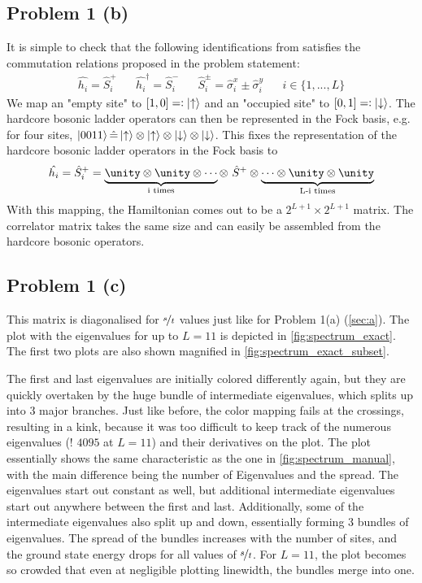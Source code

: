 \subsection{Problem 1 (b)}
    \label{sec:b}
    It is simple to check that the following identifications from  \cite{Streib} satisfies the commutation relations proposed in the problem statement:
    \begin{align}
        \hat{h_i} = \hat{S}^+_i \hspace{20pt} \hat{h_i}^\dagger = \hat{S}^-_i \hspace{20pt} \hat{S}^\pm_i = \hat{\sigma}^x_i\pm\hat{\sigma}^y_i \hspace{20pt} i \in \{1, ..., L\}
    \end{align}
    We map an "empty site" to $[1, 0] =: \ket{\uparrow}$ and an "occupied site" to $[0, 1] =: \ket{\downarrow}$. The hardcore bosonic ladder operators can then be represented in the Fock basis, e.g. for four sites, $\ket{0011} \hat{=} \ket{\uparrow} \otimes \ket{\uparrow} \otimes \ket{\downarrow} \otimes \ket{\downarrow}$. This fixes the representation of the hardcore bosonic ladder operators in the Fock basis to 
    \begin{align}
        \hat{h_i} = \hat{S}^+_i = \underbrace{\unity \otimes \unity \otimes \dotsm}_\text{i times} \otimes~\hat{S}^+ \otimes \underbrace{\dotsm \otimes \unity \otimes \unity}_\text{L-i times}
    \end{align}
    With this mapping, the Hamiltonian comes out to be a $2^{L+1} \times 2^{L+1}$ matrix. The correlator matrix takes the same size and can easily be assembled from the hardcore bosonic operators.

\subsection{Problem 1 (c)}
    \label{sec:c}
    This matrix is diagonalised for $\nicefrac{s}{t}$ values just like for Problem 1(a) (\autoref{sec:a}). The plot with the eigenvalues for up to $L=11$ is depicted in  \autoref{fig:spectrum_exact}. The first two plots are also shown magnified in \autoref{fig:spectrum_exact_subset}.
    
    The first and last eigenvalues are initially colored differently again, but they are quickly overtaken by the huge bundle of intermediate eigenvalues, which splits up into 3 major branches. Just like before, the color mapping fails at the crossings, resulting in a kink, because it was too difficult to keep track of the numerous eigenvalues (! $4095$ at $L=11$) and their derivatives on the plot. The plot essentially shows the same characteristic as the one in \autoref{fig:spectrum_manual}, with the main difference being the number of Eigenvalues and the spread. The eigenvalues start out constant as well, but additional intermediate eigenvalues start out anywhere between the first and last. Additionally, some of the intermediate eigenvalues also split up and down, essentially forming 3 bundles of eigenvalues. The spread of the bundles increases with the number of sites, and the ground state energy drops for all values of $\nicefrac{s}{t}$. For $L=11$, the plot becomes so crowded that even at negligible plotting linewidth, the bundles merge into one.
    
